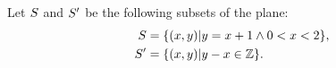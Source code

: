\documentclass[../main.tex]{subfiles}
\begin{document}
\problem{}\label{s3p5}

Let \({S}\) and \({S'}\) be the following subsets of the plane:
\begin{align*}
	{S}  &= \{(x,y)|y=x+1 \land 0 < x < 2\},\\
	{S'} &= \{(x,y)|y-x \in \mathbb{Z}\}.
\end{align*}




\end{document}

